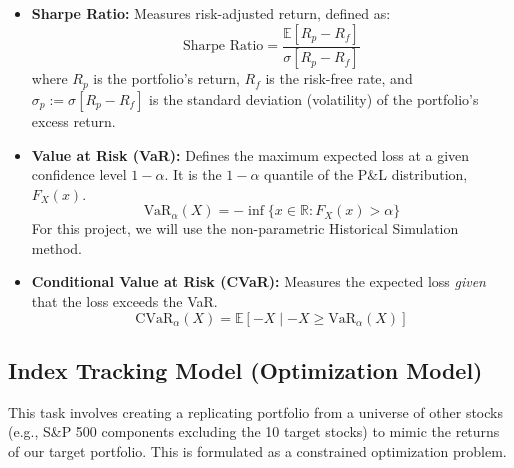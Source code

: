 \documentclass[12pt, a4paper]{article}
\begin{document}
	\begin{itemize}
		\item \textbf{Sharpe Ratio:} Measures risk-adjusted return, defined as:
		\begin{equation}
			\text{Sharpe Ratio} = \frac{\mathbb{E}[R_p - R_f]}{\sigma[R_p - R_f]}
		\end{equation}
		where $R_p$ is the portfolio's return, $R_f$ is the risk-free rate, and $\sigma_p := \sigma[R_p - R_f]$ is the standard deviation (volatility) of the portfolio's excess return.
		
		\item \textbf{Value at Risk (VaR):} Defines the maximum expected loss at a given confidence level $1-\alpha$. It is the $1-\alpha$ quantile of the P\&L distribution, $F_X(x)$.
		\begin{equation}
			\text{VaR}_{\alpha}(X) = - \inf \{x \in \mathbb{R} : F_X(x) > \alpha\}
		\end{equation}
		For this project, we will use the non-parametric Historical Simulation method.
		
		\item \textbf{Conditional Value at Risk (CVaR):} Measures the expected loss \textit{given} that the loss exceeds the VaR.
		\begin{equation}
			\text{CVaR}_{\alpha}(X) = \mathbb{E}[-X \mid -X \ge \text{VaR}_{\alpha}(X)]
		\end{equation}
	\end{itemize}
	
	\subsection{Index Tracking Model (Optimization Model)}
	This task involves creating a replicating portfolio from a universe of other stocks (e.g., S\&P 500 components excluding the 10 target stocks) to mimic the returns of our target portfolio. This is formulated as a constrained optimization problem.
	
\end{document}

